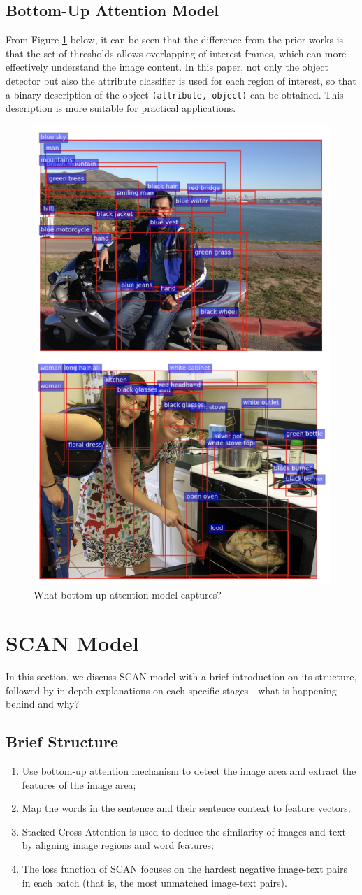 \subsection{Bottom-Up Attention Model}

From Figure \ref{fig:bottomup} below, it can be seen that the difference from the prior works is that the set of thresholds allows overlapping of interest frames, which can more effectively understand the image content. In this paper, not only the object detector but also the attribute classifier is used for each region of interest, so that a binary description of the object \verb|(attribute, object)| can be obtained. This description is more suitable for practical applications.

\begin{figure}[h!]
\centering
\includegraphics[width=.35\textwidth]{bottomup.pdf}
\caption{What bottom-up attention model captures? \cite{bottomup}}
\label{fig:bottomup}
\end{figure}

\section{SCAN Model}
In this section, we discuss SCAN model with a brief introduction on its structure, followed by in-depth explanations on each specific stages - what is happening behind and why?

\subsection{Brief Structure}
\begin{enumerate}
    \item Use bottom-up attention mechanism \cite{bottomup} to detect the image area and extract the features of the image area;
    \item Map the words in the sentence and their sentence context to feature vectors;
    \item Stacked Cross Attention is used to deduce the similarity of images and text by aligning image regions and word features;
    \item The loss function of SCAN focuses on the hardest negative image-text pairs in each batch (that is, the most unmatched image-text pairs).
\end{enumerate}

